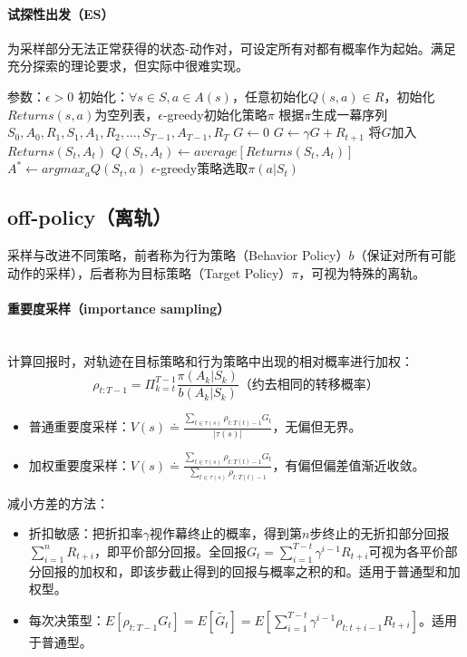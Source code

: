 \documentclass[
12pt, %
a4paper, 
oneside, %
headinclude,footinclude, %
]{scrartcl}
\begin{document}
\paragraph{试探性出发（ES）}
为采样部分无法正常获得的状态-动作对，可设定所有对都有概率作为起始。满足充分探索的理论要求，但实际中很难实现。
\begin{myalgorithm}
\State 参数：$ \epsilon > 0 $
\State 初始化：$ \forall s \in S, a \in A(s) $，任意初始化$ Q(s,a) \in R $，初始化$ Returns(s,a) $为空列表，$ \epsilon $-greedy初始化策略$ \pi $
\Loop
\State 根据$ \pi $生成一幕序列$ S_0,A_0,R_1,S_1,A_1,R_2,\dots,S_{T - 1},A_{T - 1},R_T $
\State $ G \gets 0 $
\State $ G \gets \gamma G + R_{t + 1} $
\State 将$ G $加入$ Returns(S_t,A_t) $
\State $ Q(S_t,A_t) \gets average[Returns(S_t,A_t)] $
\State $ A^* \gets argmax_a Q(S_t,a) $
\State $ \epsilon $-greedy策略选取$ \pi(a|S_t) $
\EndIf
\EndFor
\EndLoop
\end{myalgorithm}
\subsection{off-policy（离轨）}
采样与改进不同策略，前者称为行为策略（Behavior Policy）$ b $（保证对所有可能动作的采样），后者称为目标策略（Target Policy）$ \pi $，可视为特殊的离轨。
\paragraph{重要度采样（importance sampling）}~\\

计算回报时，对轨迹在目标策略和行为策略中出现的相对概率进行加权：
$$ \rho_{t:T - 1} = \Pi_{k = t}^{T - 1} \frac{\pi(A_k|S_k)}{b(A_k|S_k)} \text{（约去相同的转移概率）} $$
\begin{itemize}
\item 普通重要度采样：$ V(s) \doteq \frac{\sum_{t \in \tau(s)} \rho_{t:T(t) - 1}G_t}{|\tau(s)|} $，无偏但无界。
\item 加权重要度采样：$ V(s) \doteq \frac{\sum_{t \in \tau(s)} \rho_{t:T(t) - 1}G_t}{\sum_{t \in \tau(s)} \rho_{t:T(t) - 1}} $，有偏但偏差值渐近收敛。
\end{itemize}

减小方差的方法：
\begin{itemize}
\item 折扣敏感：把折扣率$ \gamma $视作幕终止的概率，得到第$ n $步终止的无折扣部分回报$ \sum_{i = 1}^n R_{t + i} $，即平价部分回报。全回报$ G_t = \sum_{i = 1}^{T - t} \gamma^{i - 1}R_{t + i} $可视为各平价部分回报的加权和，即该步截止得到的回报与概率之积的和。适用于普通型和加权型。
\item 每次决策型：$ E[\rho_{t:T - 1}G_t] = E[\tilde{G_t}] = E[\sum_{i = 1}^{T - t} \gamma^{i - 1} \rho_{t:t + i - 1}R_{t + i}] $。适用于普通型。
\end{itemize}
\end{document}
